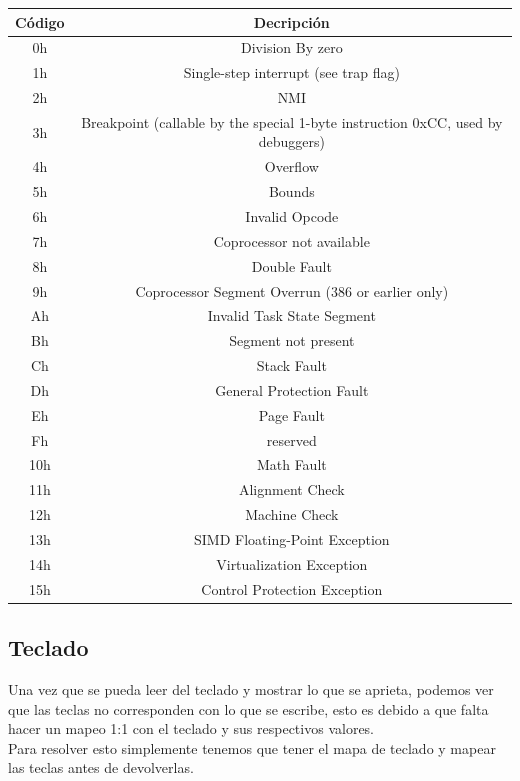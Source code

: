 \documentclass[]{article}
\begin{document}
\begin{center}
	\begin{tabular}{ |c|c| }
		\hline
		C\'odigo & Decripci\'on\\
		\hline
		0h & Division By zero\\
		1h & Single-step interrupt (see trap flag) \\
		2h & NMI\\
		3h & Breakpoint (callable by the special 1-byte instruction 0xCC, used by debuggers) \\
		4h & Overflow\\
		5h & Bounds\\
		6h & Invalid Opcode \\
		7h & Coprocessor not available \\
		8h & Double Fault\\
		9h & Coprocessor Segment Overrun (386 or earlier only) \\
		Ah & Invalid Task State Segment \\
		Bh & Segment not present \\
		Ch & Stack Fault \\
		Dh & General Protection Fault\\
		Eh & Page Fault\\
		Fh & reserved\\
		10h & Math Fault \\
		11h & Alignment Check \\
		12h & Machine Check \\
		13h & SIMD Floating-Point Exception \\
		14h & Virtualization Exception \\
		15h & Control Protection Exception \\
		\hline
	\end{tabular}
\end{center}

\subsection*{Teclado}
Una vez que se pueda leer del teclado y mostrar lo que se aprieta, podemos ver que las teclas
no corresponden con lo que se escribe, esto es debido a que falta hacer un mapeo 1:1 con el teclado y sus respectivos valores. \\

Para resolver esto simplemente tenemos que tener el mapa de teclado y mapear las teclas antes de devolverlas.
\end{document}
